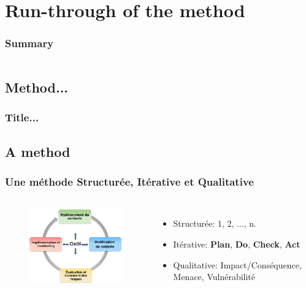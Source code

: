  
%
%
\section{Run-through of the method}
\begin{frame}
    \frametitle{Summary}
    \begin{columns}[t]
        \begin{column}{5cm}
            \tableofcontents[sections={1-3}, currentsection, hideothersubsections]
        \end{column}
        \begin{column}{5cm}
            \tableofcontents[sections={4-5}, currentsection, hideothersubsections]
        \end{column}
    \end{columns}
\end{frame}
\subsection{Method...}
\begin{frame}
    \frametitle{Title...}
    \framesubtitle{}
\end{frame}




\subsection{A method}
\begin{frame}
    \frametitle{Une méthode Structurée, Itérative et Qualitative}
    \framesubtitle{}
    \begin{columns}[t]
        \column{6.0cm}
        \begin{figure}
        \includegraphics[width=6.0cm]{./images/MONARC-method-1.png}
        \end{figure}
        \column{6cm}
        \begin{itemize}
                \item Structurée: 1, 2, ..., n.
                \item Itérative: \textbf{Plan}, \textbf{Do}, \textbf{Check}, \textbf{Act}
                \item Qualitative: Impact/Conséquence, Menace, Vulnérabilité
        \end{itemize}
        \end{columns}
\end{frame}


